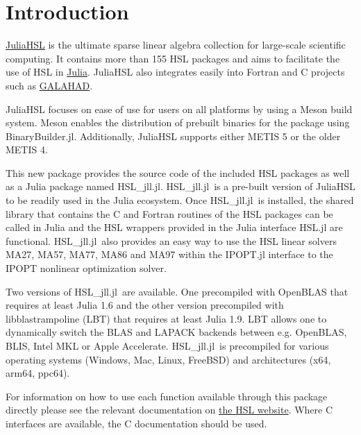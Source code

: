 \documentclass[gdweb]{geradwp}
\newcommand{\HSLjll}{HSL\_jll.jl}
\begin{document}

\GDarticlestart

\section{Introduction}

\href{https://licences.stfc.ac.uk/product/julia-hsl}{JuliaHSL} is the ultimate sparse linear algebra collection for large-scale scientific computing.
It contains more than 155 HSL packages and aims to facilitate the use of HSL in \href{https://julialang.org/}{Julia}.
JuliaHSL also integrates easily into Fortran and C projects such as \href{https://github.com/ralna/GALAHAD}{GALAHAD}.

JuliaHSL focuses on ease of use for users on all platforms by using a Meson build system.
Meson enables the distribution of prebuilt binaries for the package using BinaryBuilder.jl.
Additionally, JuliaHSL supports either METIS 5 or the older METIS 4.

This new package provides the source code of the included HSL packages as well as a Julia package named \HSLjll.
\HSLjll~is a pre-built version of JuliaHSL to be readily used in the Julia ecosystem.
Once \HSLjll~is installed, the shared library that contains the C and Fortran routines of the HSL packages can be called in Julia and the HSL wrappers provided in the Julia interface HSL.jl are functional.
\HSLjll~also provides an easy way to use the HSL linear solvers MA27, MA57, MA77, MA86 and MA97 within the IPOPT.jl interface to the IPOPT nonlinear optimization solver.

Two versions of \HSLjll~are available. One precompiled with OpenBLAS that requires at least Julia 1.6 and the other version precompiled with libblastrampoline (LBT) that requires at least Julia 1.9.
LBT allows one to dynamically switch the BLAS and LAPACK backends between e.g. OpenBLAS, BLIS, Intel MKL or Apple Accelerate.
\HSLjll~is precompiled for various operating systems (Windows, Mac, Linux, FreeBSD) and architectures (x64, arm64, ppc64).

For information on how to use each function available through this package directly please see the relevant documentation on \href{https://www.hsl.rl.ac.uk/catalogue/}{the HSL website}.
Where C interfaces are available, the C documentation should be used.
\end{document}
